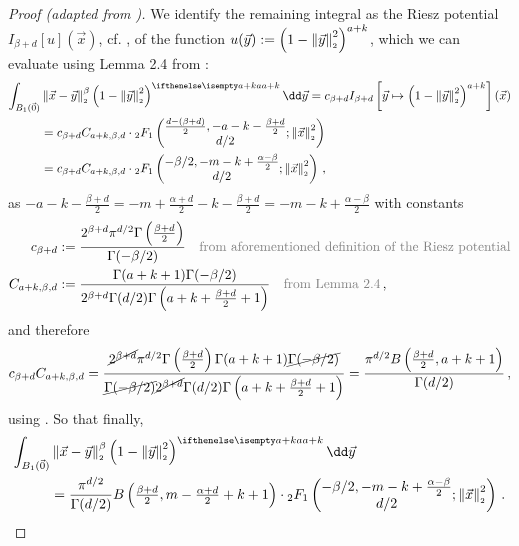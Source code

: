 \begin{proof}[Proof (adapted from \cite{2021-arbitrary-dimensions})]
  We identify the remaining integral as the Riesz potential $I_{\beta+d}[u](\vec{x})$, cf. , of the function $u(\vec{y}) := \left(1-\left\lVert\vec{y}\right\rVert_{\scriptscriptstyle 2}^2\right)^{a+k}$, which we can evaluate using Lemma 2.4 from \cite{2011-porous-medium-1}:
  \begin{align*}
    \int_{B_1(\vec{0})} & \norm{\vec{x}-\vec{y}}^\beta \weight[a+k]{y} \dd\vec{y} = c_{\beta+d} I_{\beta+d}\left[\vec{y} \mapsto \left(1-\norm{\vec{y}}^2\right)^{a+k}\right](\vec{x}) \\
                        & = c_{\beta+d} C_{a+k, \beta, d} \cdot {}_2F_1\left(\begin{matrix}\frac{d-(\beta+d)}{2}, -a-k-\frac{\beta+d}{2} \\d/2\end{matrix}; \norm{\vec{x}}^2\right)    \\
                        & = c_{\beta+d} C_{a+k, \beta, d} \cdot {}_2F_1\left(\begin{matrix}-\beta/2, -m-k+\frac{\alpha-\beta}{2} \\d/2\end{matrix}; \norm{\vec{x}}^2\right)\,,
  \end{align*}
  as $-a-k-\frac{\beta+d}{2} = -m + \frac{\alpha+d}{2} -k - \frac{\beta+d}{2} = -m-k+\frac{\alpha-\beta}{2}$ with constants
  \begin{align*}
    c_{\beta+d}       & := \frac{2^{\beta+d} \pi^{d/2} \Gamma\left(\frac{\beta+d}{2}\right)}{\Gamma(-\beta/2)}                      \quad \text{\textcolor{gray}{from aforementioned definition of the Riesz potential}} \\
    C_{a+k, \beta, d} & := \frac{\Gamma(a+k+1) \Gamma(-\beta/2)}{2^{\beta+d}\Gamma(d/2) \Gamma\left(a+k+\frac{\beta+d}{2}+1\right)} \quad \text{\textcolor{gray}{from Lemma 2.4}}\,,
  \end{align*}
  and therefore
  $$c_{\beta+d} C_{a+k, \beta, d} = \frac{\cancel{2^{\beta+d}} \pi^{d/2} \Gamma\left(\frac{\beta+d}{2}\right) \Gamma(a+k+1) \cancel{\Gamma(-\beta/2)}}{\cancel{\Gamma(-\beta/2)} \cancel{2^{\beta+d}}\Gamma(d/2) \Gamma\left(a+k+\frac{\beta+d}{2}+1\right)} = \frac{\pi^{d/2}B\left(\tfrac{\beta+d}{2}, a+k+1\right)}{\Gamma(d/2)}\,,$$
  using .
  So that finally,
  \begin{align*}
    \int_{B_1(\vec{0})} & \norm{\vec{x}-\vec{y}}^\beta \weight[a+k]{y} \dd\vec{y}                                                                                                                                                         \\
                        & =\frac{\pi^{d/2}}{\Gamma(d/2)} B\left(\tfrac{\beta+d}{2}, m-\tfrac{\alpha+d}{2}+k+1\right) \cdot {}_2F_1\left(\begin{matrix}-\beta/2, -m-k+\frac{\alpha-\beta}{2} \\d/2\end{matrix}; \norm{\vec{x}}^2\right)\,.
  \end{align*}


\end{proof}
